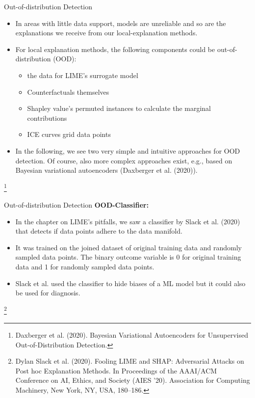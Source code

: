 \documentclass[11pt,compress,t,notes=noshow, xcolor=table]{beamer}
\begin{document}
\begin{vbframe}{Out-of-distribution Detection}
	\begin{itemize}
		\item In areas with little data support, models are unreliable and so are the explanations we receive from our local-explanation methods.
		\item For local explanation methods, the following components could be out-of-distribution (OOD): 
		\begin{itemize}
			\item the data for LIME's surrogate model
			\item Counterfactuals themselves
			\item Shapley value's permuted instances to calculate the marginal contributions 
			\item ICE curves grid data points 
		\end{itemize}
		\item In the following, we see two very simple and intuitive approaches for OOD detection. Of course, also more complex approaches exist, e.g., based on Bayesian variational autoencoders (Daxberger et al. (2020)).
	\end{itemize}
\footnote[frame]{Daxberger et al. (2020). Bayesian Variational Autoencoders for Unsupervised Out-of-Distribution Detection.}
\end{vbframe}


\begin{vbframe}{Out-of-distribution Detection}
	\textbf{OOD-Classifier:} 
	\begin{itemize}
		\item In the chapter on LIME's pitfalls, we saw a classifier by Slack et al. (2020) that detects if data points adhere to the data manifold. 
		\item It was trained on the joined dataset of original training data and randomly sampled data points. 
		The binary outcome variable is 0 for original training data and 1 for randomly sampled data points. 
		\item Slack et al. used the classifier to hide biases of a ML model but it could also be used for diagnosis.  
	\end{itemize}
	\footnote[frame]{Dylan Slack et al. (2020). Fooling LIME and SHAP: Adversarial Attacks on Post hoc Explanation Methods. In Proceedings of the AAAI/ACM Conference on AI, Ethics, and Society (AIES '20). Association for Computing Machinery, New York, NY, USA, 180–186.}
\end{vbframe}
\end{document}
